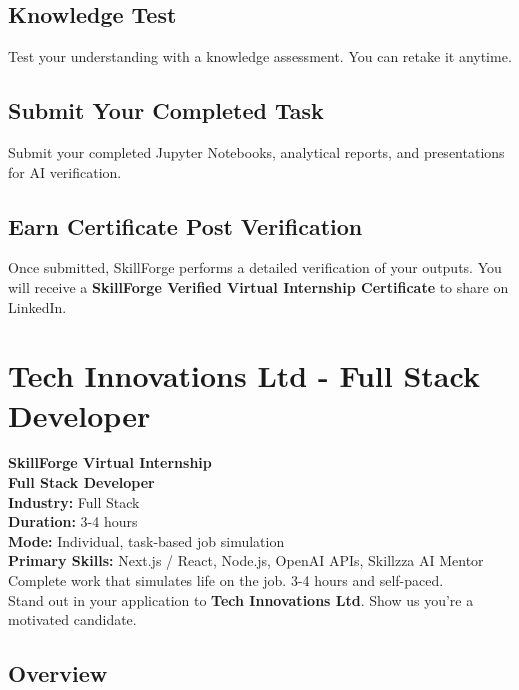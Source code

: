 \documentclass{article}
\begin{document}
\subsection*{Knowledge Test}
Test your understanding with a knowledge assessment. You can retake it anytime.\\

\subsection*{Submit Your Completed Task}
Submit your completed Jupyter Notebooks, analytical reports, and presentations for AI verification.\\

\subsection*{Earn Certificate Post Verification}
Once submitted, SkillForge performs a detailed verification of your outputs. You will receive a \textbf{SkillForge Verified Virtual Internship Certificate} to share on LinkedIn.\\

\newpage

\section{Tech Innovations Ltd - Full Stack Developer}

\textbf{SkillForge Virtual Internship} \\
\textbf{Full Stack Developer} \\

\textbf{Industry:} Full Stack \\
\textbf{Duration:} 3-4 hours \\
\textbf{Mode:} Individual, task-based job simulation \\
\textbf{Primary Skills:} Next.js / React, Node.js, OpenAI APIs, Skillzza AI Mentor \\

Complete work that simulates life on the job. 3-4 hours and self-paced. \\
Stand out in your application to \textbf{Tech Innovations Ltd}. Show us you're a motivated candidate. \\

\subsection*{Overview}
\end{document}
